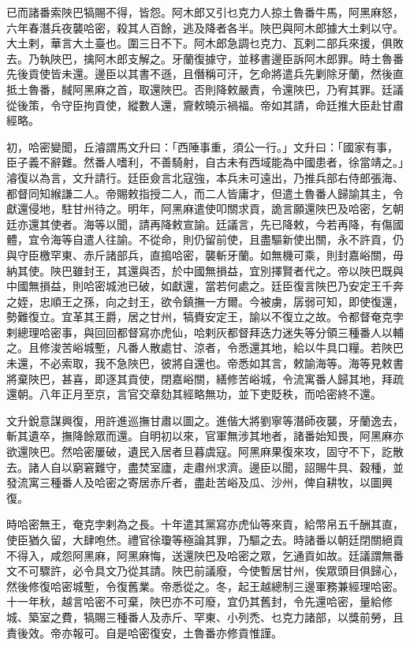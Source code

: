 \begin{pinyinscope}
已而諸番索陜巴犒賜不得，皆怨。阿木郎又引乜克力人掠土魯番牛馬，阿黑麻怒，六年春潛兵夜襲哈密，殺其人百餘，逃及降者各半。陜巴與阿木郎據大土剌以守。大土剌，華言大土臺也。圍三日不下。阿木郎急調乜克力、瓦剌二部兵來援，俱敗去。乃執陜巴，擒阿木郎支解之。牙蘭復據守，並移書邊臣訴阿木郎罪。時土魯番先後貢使皆未還。邊臣以其書不遜，且僭稱可汗，乞命將遣兵先剿除牙蘭，然後直抵土魯番，馘阿黑麻之首，取還陜巴。否則降敕嚴責，令還陜巴，乃宥其罪。廷議從後策，令守臣拘貢使，縱數人還，齎敕曉示禍福。帝如其請，命廷推大臣赴甘肅經略。

初，哈密變聞，丘濬謂馬文升曰：「西陲事重，須公一行。」文升曰：「國家有事，臣子義不辭難。然番人嗜利，不善騎射，自古未有西域能為中國患者，徐當靖之。」濬復以為言，文升請行。廷臣僉言北寇強，本兵未可遠出，乃推兵部右侍郎張海、都督同知緱謙二人。帝賜敕指授二人，而二人皆庸才，但遣土魯番人歸諭其主，令獻還侵地，駐甘州待之。明年，阿黑麻遣使叩關求貢，詭言願還陜巴及哈密，乞朝廷亦還其使者。海等以聞，請再降敕宣諭。廷議言，先已降敕，今若再降，有傷國體，宜令海等自遣人往諭。不從命，則仍留前使，且盡驅新使出關，永不許貢，仍與守臣檄罕東、赤斤諸部兵，直搗哈密，襲斬牙蘭。如無機可乘，則封嘉峪關，毋納其使。陜巴雖封王，其還與否，於中國無損益，宜別擇賢者代之。帝以陜巴既與中國無損益，則哈密城池已破，如獻還，當若何處之。廷臣復言陜巴乃安定王千奔之姪，忠順王之孫，向之封王，欲令鎮撫一方爾。今被虜，孱弱可知，即使復還，勢難復立。宜革其王爵，居之甘州，犒賚安定王，諭以不復立之故。令都督奄克孛剌總理哈密事，與回回都督寫亦虎仙，哈剌灰都督拜迭力迷失等分領三種番人以輔之。且修浚苦峪城塹，凡番人散處甘、涼者，令悉還其地，給以牛具口糧。若陜巴未還，不必索取，我不急陜巴，彼將自還也。帝悉如其言，敕諭海等。海等見敕書將棄陜巴，甚喜，即逐其貢使，閉嘉峪關，繕修苦峪城，令流寓番人歸其地，拜疏還朝。八年正月至京，言官交章劾其經略無功，並下吏貶秩，而哈密終不還。

文升銳意謀興復，用許進巡撫甘肅以圖之。進偕大將劉寧等潛師夜襲，牙蘭逸去，斬其遺卒，撫降餘眾而還。自明初以來，官軍無涉其地者，諸番始知畏，阿黑麻亦欲還陜巴。然哈密屢破，遺民入居者旦暮虞寇。阿黑麻果復來攻，固守不下，訖散去。諸人自以窮窘難守，盡焚室廬，走肅州求濟。邊臣以聞，詔賜牛具、穀種，並發流寓三種番人及哈密之寄居赤斤者，盡赴苦峪及瓜、沙州，俾自耕牧，以圖興復。

時哈密無王，奄克孛剌為之長。十年遣其黨寫亦虎仙等來貢，給幣帛五千酬其直，使臣猶久留，大肆咆烋。禮官徐瓊等極論其罪，乃驅之去。時諸番以朝廷閉關絕貢不得入，咸怨阿黑麻，阿黑麻悔，送還陜巴及哈密之眾，乞通貢如故。廷議謂無番文不可驟許，必令具文乃從其請。陜巴前議廢，今使暫居甘州，俟眾頭目俱歸心，然後修復哈密城塹，令復舊業。帝悉從之。冬，起王越總制三邊軍務兼經理哈密。十一年秋，越言哈密不可棄，陜巴亦不可廢，宜仍其舊封，令先還哈密，量給修城、築室之費，犒賜三種番人及赤斤、罕東、小列禿、乜克力諸部，以獎前勞，且責後效。帝亦報可。自是哈密復安，土魯番亦修貢惟謹。


\end{pinyinscope}
